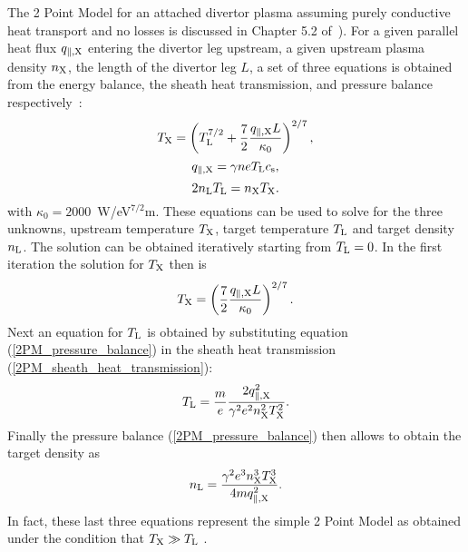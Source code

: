 \documentclass[amsmath,amssymb,a4]{revtex4}
\begin{document}
The 2 Point Model for an attached divertor plasma assuming purely conductive heat transport and no losses is discussed in Chapter 5.2 of~\cite{stangeby}). For a given parallel heat flux $q_{\parallel,\rm X}$ entering the divertor leg upstream, a given upstream plasma density $n_{\rm X}$, the length of the divertor leg $L$, a set of three equations is obtained from the energy balance, the sheath heat transmission, and pressure balance respectively~\cite{stangeby}:
\begin{equation}\label{2PM_energy_balance}
    T_{\rm X} = \left(T_{\rm L}^{7/2} + {7 \over 2} {q_{\parallel,\rm X} L \over \kappa_0}\right)^{2/7},
\end{equation}
\begin{equation}\label{2PM_sheath_heat_transmission}
    q_{\parallel,\rm X} = \gamma n e T_{\rm L} c_{\rm s},
\end{equation}
\begin{equation}\label{2PM_pressure_balance}
    2 n_{\rm L} T_{\rm L} = n_{\rm X} T_{\rm X}.
\end{equation}
with $\kappa_0 = 2000$~W/eV$^{7/2}$m. These equations can be used to solve for the three unknowns, upstream temperature $T_{\rm X}$, target temperature $T_{\rm L}$ and target density $n_{\rm L}$. The solution can be obtained iteratively starting from $T_{\rm L} = 0$. In the first iteration the solution for $T_{\rm X}$ then is
\begin{equation}\label{2PM_upstream_temperature}
    T_{\rm X} = \left({7 \over 2} {q_{\parallel,\rm X} L \over \kappa_0}\right)^{2/7}.
\end{equation}
Next an equation for $T_{\rm L}$ is obtained by substituting equation (\ref{2PM_pressure_balance}) in the sheath heat transmission (\ref{2PM_sheath_heat_transmission}):
\begin{equation}\label{2PM_target_temperature}
    T_{\rm L} = {m \over e} {2 q_{\parallel,\rm X}^2 \over \gamma^2 e^2 n_{\rm X}^2 T_{\rm X}^2}.
\end{equation}
Finally the pressure balance (\ref{2PM_pressure_balance}) then allows to obtain the target density as
\begin{equation}\label{2PM_target_density}
    n_{\rm L} = {\gamma^2 e^3 n_{\rm X}^3 T_{\rm X}^3 \over 4 m q_{\parallel,\rm X}^2}.
\end{equation}
In fact, these last three equations represent the simple 2 Point Model as obtained under the condition that $T_{\rm X} \gg T_{\rm L}$ \cite{stangeby}.
\end{document}
